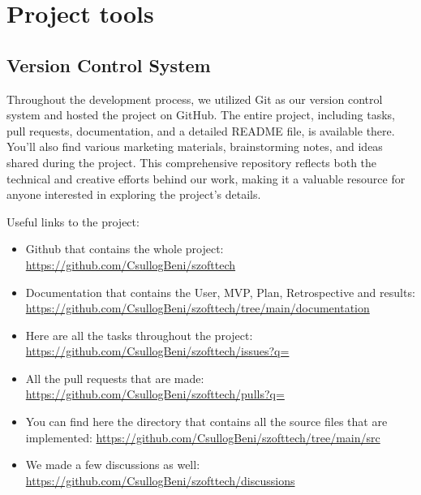 \documentclass{article}
\begin{document}
\section{Project tools}

\subsection{Version Control System}

Throughout the development process, we utilized Git as our version control system and hosted the project on GitHub. The entire project, including tasks, pull requests, documentation, and a detailed README file, is available there. You'll also find various marketing materials, brainstorming notes, and ideas shared during the project. This comprehensive repository reflects both the technical and creative efforts behind our work, making it a valuable resource for anyone interested in exploring the project's details.

Useful links to the project:
\begin{itemize}
    \item Github that contains the whole project: \href{https://github.com/CsullogBeni/szofttech}{https://github.com/CsullogBeni/szofttech}
    \item Documentation that contains the User, MVP, Plan, Retrospective and results: \href{https://github.com/CsullogBeni/szofttech/tree/main/documentation}{https://github.com/CsullogBeni/szofttech/tree/main/documentation}
    \item Here are all the tasks throughout the project: \href{https://github.com/CsullogBeni/szofttech/issues?q=}{https://github.com/CsullogBeni/szofttech/issues?q=}
    \item All the pull requests that are made: \href{https://github.com/CsullogBeni/szofttech/pulls?q=}{https://github.com/CsullogBeni/szofttech/pulls?q=}
    \item You can find here the directory that contains all the source files that are implemented: \href{https://github.com/CsullogBeni/szofttech/tree/main/src}{https://github.com/CsullogBeni/szofttech/tree/main/src}
    \item We made a few discussions as well: \href{https://github.com/CsullogBeni/szofttech/discussions}{https://github.com/CsullogBeni/szofttech/discussions}
\end{itemize}
\end{document}

